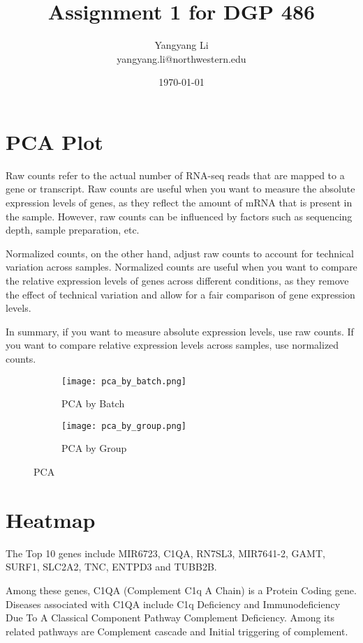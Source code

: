 \documentclass{article}
\title{Assignment 1 for DGP 486}
\author{Yangyang Li\\
 yangyang.li@northwestern.edu}
\date{\today}
\begin{document}
\maketitle

\section{PCA Plot}

Raw counts refer to the actual number of RNA-seq reads that are mapped to a gene or transcript.
Raw counts are useful when you want to measure the absolute expression levels of genes, as they reflect the amount of mRNA that is present in the sample.
However, raw counts can be influenced by factors such as sequencing depth, sample preparation, etc.

Normalized counts, on the other hand, adjust raw counts to account for technical variation across samples.
Normalized counts are useful when you want to compare the relative expression levels of genes across different conditions, as they remove the effect of technical variation and allow for a fair comparison of gene expression levels.

In summary, if you want to measure absolute expression levels, use raw counts. If you want to compare relative expression levels across samples, use normalized counts.

\begin{figure}[h]
\begin{subfigure}{0.5\textwidth}
	\texttt{[image: pca\_by\_batch.png]}
	\caption{PCA by Batch}
	\label{fig:pca-by-batch}
\end{subfigure}
\begin{subfigure}{0.5\textwidth}
	\texttt{[image: pca\_by\_group.png]}
	\caption{PCA by Group}
	\label{fig:pca-by-group}
\end{subfigure}

\caption{PCA}
\end{figure}


\section{Heatmap}


The Top 10 genes include MIR6723, C1QA, RN7SL3, MIR7641-2, GAMT, SURF1, SLC2A2, TNC, ENTPD3 and TUBB2B.

Among these genes, C1QA (Complement C1q A Chain) is a Protein Coding gene.
Diseases associated with C1QA include C1q Deficiency and Immunodeficiency Due To A Classical Component Pathway Complement Deficiency.
Among its related pathways are Complement cascade and Initial triggering of complement.
\end{document}
